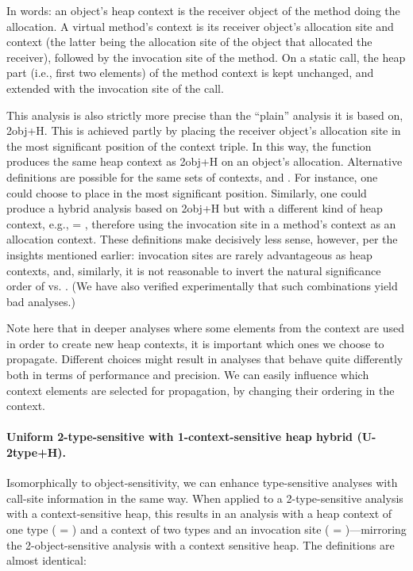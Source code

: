 In words: an object's heap context is the receiver object of the method doing the allocation. A virtual method's context is its receiver object's allocation site and context (the latter being the allocation site of the object that allocated the receiver), followed by the invocation site of the method. On a static call, the heap part (i.e., first two elements) of the method context is kept unchanged, and extended with the invocation site of the call.

This analysis is also strictly more precise than the ``plain'' analysis it is based on, 2obj+H. This is achieved partly by placing the receiver object's allocation site in the most significant position of the context triple. In this way, the  function produces the same heap context as 2obj+H on an object's allocation. Alternative definitions are possible for the same sets of contexts,  and . For instance, one could choose to place  in the most significant position. Similarly, one could produce a hybrid analysis based on 2obj+H but with a different kind of heap context, e.g.,  = , therefore using the invocation site in a method's context as an allocation context. These definitions make decisively less sense, however, per the insights mentioned earlier: invocation sites are rarely advantageous as heap contexts, and, similarly, it is not reasonable to invert the natural significance order of  vs. . (We have also verified experimentally that such combinations yield bad analyses.)

Note here that in deeper analyses where some elements from the context are used in order to create new heap contexts, it is important which ones we choose to propagate. Different choices might result in analyses that behave quite differently both in terms of performance and precision. We can easily influence which context elements are selected for propagation, by changing their ordering in the context.

\paragraph{Uniform 2-type-sensitive with 1-context-sensitive heap hybrid (U-2type+H).}
Isomorphically to object-sensitivity, we can enhance type-sensitive analyses with call-site information in the same way. When applied to a 2-type-sensitive analysis with a context-sensitive heap, this results in an analysis with a heap context of one type ( = ) and a context of two types and an invocation site ( = )---mirroring the 2-object-sensitive analysis with a context sensitive heap. The definitions are almost identical:

